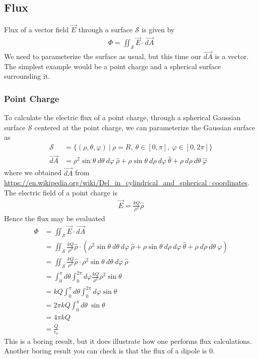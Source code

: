 \documentclass{article}
\begin{document}
\subsection{Flux}
Flux of a vector field $\vec{E}$ through a surface $\mathcal{S}$ is given by 
\begin{align}
    \Phi = \iint_\mathcal{S} \vec{E} \cdot \overrightarrow{dA}
\end{align}
We need to parameterize the surface as usual, but this time our $\overrightarrow{dA}$ is a vector. The simplest example would be a point charge and a spherical surface surrounding it.
\subsubsection{Point Charge}
To calculate the electric flux of a point charge, through a spherical Gaussian surface $\mathcal{S}$ centered at the point charge, we can parameterize the Gaussian surface as
\begin{align}
    \mathcal{S} &= \{ (\rho,\theta,\varphi)\ \vert\ \rho = R,\ \theta \in [0,\pi],\ \varphi \in [0,2\pi] \} \\
    \overrightarrow{dA} &= \rho^2 \sin \theta\ d\theta\ d\varphi\ \hat{\rho} + \rho\sin\theta\ d\rho\ d\varphi\ \hat{\theta} + \rho\ d\rho\ d\theta\ \hat{\varphi} 
\end{align}
where we obtained $\overrightarrow{dA}$ from \url{https://en.wikipedia.org/wiki/Del_in_cylindrical_and_spherical_coordinates}. \\[10pt]
The electric field of a point charge is 
\begin{align}
    \vec{E} = \frac{kQ}{\rho^2} \hat{\rho}
\end{align}
Hence the flux may be evaluated
\begin{align}
    \Phi &= \iint_\mathcal{S} \vec{E} \cdot \overrightarrow{dA} \\
    &= \iint_\mathcal{S} \frac{kQ}{\rho^2} \hat{\rho} \cdot (\rho^2 \sin \theta\ d\theta\ d\varphi\ \hat{\rho} + \rho\sin\theta\ d\rho\ d\varphi\ \hat{\theta} + \rho\ d\rho\ d\theta\ \hat{\varphi}) \\
    &= \iint_\mathcal{S} \frac{kQ}{\rho^2} \hat{\rho} \cdot \rho^2 \sin \theta\ d\theta\ d\varphi\ \hat{\rho} \\
    &= \int_0^{\pi} d\theta \int_0^{2\pi} d\varphi \frac{kQ}{\rho^2} \rho^2 \sin \theta \\
    &= kQ \int_0^{\pi} d\theta \int_0^{2\pi} d\varphi \sin \theta \\
    &= 2\pi kQ \int_0^{\pi} d\theta\ \sin \theta \\
    &= 4\pi kQ \\
    &= \frac{Q}{\epsilon_0}
\end{align}
This is a boring result, but it does illustrate how one performs flux calculations. Another boring result you can check is that the flux of a dipole is $0$.
\end{document}
